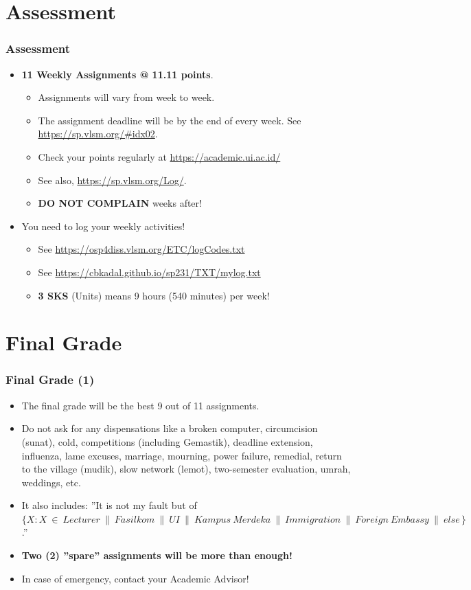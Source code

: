\documentclass[aspectratio=169, xcolor=table, notheorems, hyperref={pdfpagelabels=false}]{beamer}
\begin{document}
\section{Assessment}
\begin{frame}
\frametitle{Assessment}

\begin{itemize}
\item \textbf{11 Weekly Assignments @ 11.11 points}.
\begin{itemize}
\item Assignments will vary from week to week.
\item The assignment deadline will be by the end of every week.
See \url{https://sp.vlsm.org/\#idx02}.
\item Check your points regularly at \url{https://academic.ui.ac.id/}
\item See also, \url{https://sp.vlsm.org/Log/}.
\item \textbf{DO NOT COMPLAIN} weeks after!
\end{itemize}
\item You need to log your weekly activities!
\begin{itemize}
\item See \url{https://osp4diss.vlsm.org/ETC/logCodes.txt}
\item See \url{https://cbkadal.github.io/sp231/TXT/mylog.txt}
\item \textbf{3 SKS} (Units) means 9 hours (540 minutes) per week!
\end{itemize}
\end{itemize}

\end{frame}

\section{Final Grade}
\begin{frame}
\frametitle{Final Grade (1)}

\begin{itemize}
\item The final grade will be the best 9 out of 11 assignments.
\item Do not ask for any dispensations like a broken computer, circumcision (sunat), cold, competitions 
      (including Gemastik), deadline extension, influenza, lame excuses, marriage, mourning, 
      power failure, remedial, return to the village (mudik), slow network (lemot), two-semester evaluation, umrah,
      weddings, etc. 
\item It also includes: ''It is not my fault but of $\{ X\!: X\ \in\ Lecturer\ \parallel\ Fasilkom\ 
      \parallel\ UI\ \parallel\ Kampus\ Merdeka\ \parallel\ Immigration\ \parallel\ Foreign\ Embassy\ \parallel\ 
      else\, \}$.''
\item \textbf{Two (2) ''spare'' assignments will be more than enough!}
\item In case of emergency, contact your Academic Advisor!
\end{itemize}
\end{frame}
\end{document}
